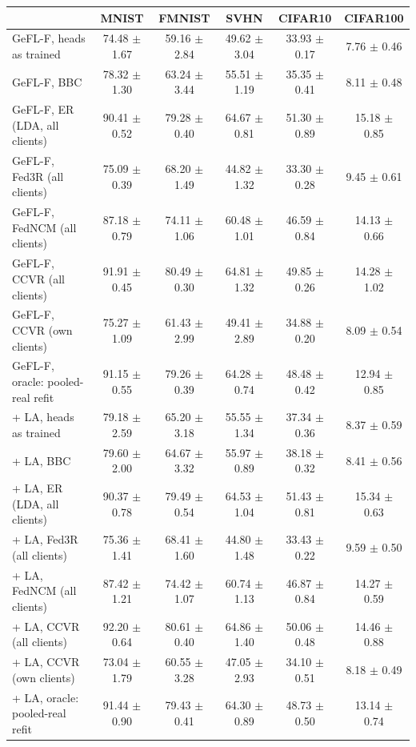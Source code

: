 \begin{tabular}{lccccc}
\toprule
 & MNIST & FMNIST & SVHN & CIFAR10 & CIFAR100 \\
\midrule
GeFL-F, heads as trained & 74.48 $\pm$ 1.67 & 59.16 $\pm$ 2.84 & 49.62 $\pm$ 3.04 & 33.93 $\pm$ 0.17 & 7.76 $\pm$ 0.46 \\
GeFL-F, BBC & 78.32 $\pm$ 1.30 & 63.24 $\pm$ 3.44 & 55.51 $\pm$ 1.19 & 35.35 $\pm$ 0.41 & 8.11 $\pm$ 0.48 \\
GeFL-F, ER (LDA, all clients) & 90.41 $\pm$ 0.52 & 79.28 $\pm$ 0.40 & 64.67 $\pm$ 0.81 & 51.30 $\pm$ 0.89 & 15.18 $\pm$ 0.85 \\
GeFL-F, Fed3R (all clients) & 75.09 $\pm$ 0.39 & 68.20 $\pm$ 1.49 & 44.82 $\pm$ 1.32 & 33.30 $\pm$ 0.28 & 9.45 $\pm$ 0.61 \\
GeFL-F, FedNCM (all clients) & 87.18 $\pm$ 0.79 & 74.11 $\pm$ 1.06 & 60.48 $\pm$ 1.01 & 46.59 $\pm$ 0.84 & 14.13 $\pm$ 0.66 \\
GeFL-F, CCVR (all clients) & 91.91 $\pm$ 0.45 & 80.49 $\pm$ 0.30 & 64.81 $\pm$ 1.32 & 49.85 $\pm$ 0.26 & 14.28 $\pm$ 1.02 \\
GeFL-F, CCVR (own clients) & 75.27 $\pm$ 1.09 & 61.43 $\pm$ 2.99 & 49.41 $\pm$ 2.89 & 34.88 $\pm$ 0.20 & 8.09 $\pm$ 0.54 \\
GeFL-F, oracle: pooled-real refit & 91.15 $\pm$ 0.55 & 79.26 $\pm$ 0.39 & 64.28 $\pm$ 0.74 & 48.48 $\pm$ 0.42 & 12.94 $\pm$ 0.85 \\
+ LA, heads as trained & 79.18 $\pm$ 2.59 & 65.20 $\pm$ 3.18 & 55.55 $\pm$ 1.34 & 37.34 $\pm$ 0.36 & 8.37 $\pm$ 0.59 \\
+ LA, BBC & 79.60 $\pm$ 2.00 & 64.67 $\pm$ 3.32 & 55.97 $\pm$ 0.89 & 38.18 $\pm$ 0.32 & 8.41 $\pm$ 0.56 \\
+ LA, ER (LDA, all clients) & 90.37 $\pm$ 0.78 & 79.49 $\pm$ 0.54 & 64.53 $\pm$ 1.04 & 51.43 $\pm$ 0.81 & 15.34 $\pm$ 0.63 \\
+ LA, Fed3R (all clients) & 75.36 $\pm$ 1.41 & 68.41 $\pm$ 1.60 & 44.80 $\pm$ 1.48 & 33.43 $\pm$ 0.22 & 9.59 $\pm$ 0.50 \\
+ LA, FedNCM (all clients) & 87.42 $\pm$ 1.21 & 74.42 $\pm$ 1.07 & 60.74 $\pm$ 1.13 & 46.87 $\pm$ 0.84 & 14.27 $\pm$ 0.59 \\
+ LA, CCVR (all clients) & 92.20 $\pm$ 0.64 & 80.61 $\pm$ 0.40 & 64.86 $\pm$ 1.40 & 50.06 $\pm$ 0.48 & 14.46 $\pm$ 0.88 \\
+ LA, CCVR (own clients) & 73.04 $\pm$ 1.79 & 60.55 $\pm$ 3.28 & 47.05 $\pm$ 2.93 & 34.10 $\pm$ 0.51 & 8.18 $\pm$ 0.49 \\
+ LA, oracle: pooled-real refit & 91.44 $\pm$ 0.90 & 79.43 $\pm$ 0.41 & 64.30 $\pm$ 0.89 & 48.73 $\pm$ 0.50 & 13.14 $\pm$ 0.74 \\
\bottomrule
\end{tabular}
